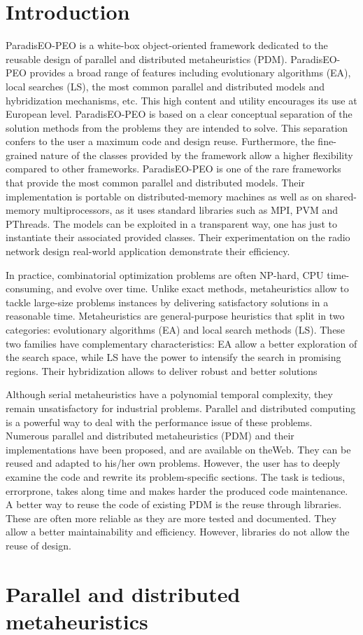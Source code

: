 \section{Introduction}\label{main_intro}
Paradis\-EO-PEO is a white-box object-oriented framework dedicated to the reusable design of parallel and distributed metaheuristics (PDM). Paradis\-EO-PEO provides a broad range of features including evolutionary algorithms (EA), local searches (LS), the most common parallel and distributed models and hybridization mechanisms, etc. This high content and utility encourages its use at European level. Paradis\-EO-PEO is based on a clear conceptual separation of the solution methods from the problems they are intended to solve. This separation confers to the user a maximum code and design reuse. Furthermore, the fine-grained nature of the classes provided by the framework allow a higher flexibility compared to other frameworks. Paradis\-EO-PEO is one of the rare frameworks that provide the most common parallel and distributed models. Their implementation is portable on distributed-memory machines as well as on shared-memory multiprocessors, as it uses standard libraries such as MPI, PVM and PThreads. The models can be exploited in a transparent way, one has just to instantiate their associated provided classes. Their experimentation on the radio network design real-world application demonstrate their efficiency.

In practice, combinatorial optimization problems are often NP-hard, CPU time-consuming, and evolve over time. Unlike exact methods, metaheuristics allow to tackle large-size problems instances by delivering satisfactory solutions in a reasonable time. Metaheuristics are general-purpose heuristics that split in two categories: evolutionary algorithms (EA) and local search methods (LS). These two families have complementary characteristics: EA allow a better exploration of the search space, while LS have the power to intensify the search in promising regions. Their hybridization allows to deliver robust and better solutions

Although serial metaheuristics have a polynomial temporal complexity, they remain unsatisfactory for industrial problems. Parallel and distributed computing is a powerful way to deal with the performance issue of these problems. Numerous parallel and distributed metaheuristics (PDM) and their implementations have been proposed, and are available on the\-Web. They can be reused and adapted to his/her own problems. However, the user has to deeply examine the code and rewrite its problem-specific sections. The task is tedious, errorprone, takes along time and makes harder the produced code maintenance. A better way to reuse the code of existing PDM is the reuse through libraries. These are often more reliable as they are more tested and documented. They allow a better maintainability and efficiency. However, libraries do not allow the reuse of design.\section{Parallel and distributed metaheuristics}\label{main_parallel_metaheuristics}
